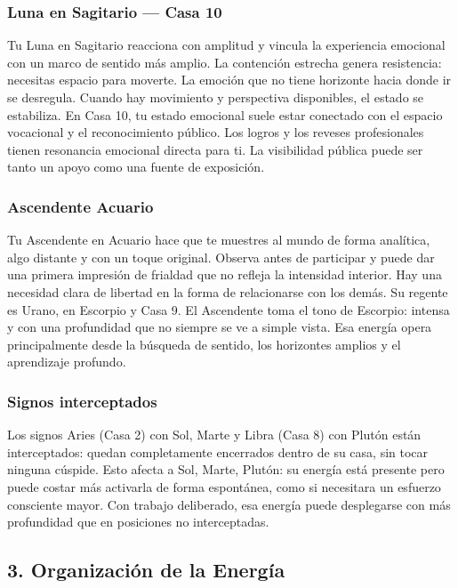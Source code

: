 \documentclass[11pt,a4paper]{article}
\begin{document}
\subsubsection*{Luna en Sagitario — Casa 10}
Tu Luna en Sagitario reacciona con amplitud y vincula la experiencia emocional con un marco de sentido más amplio. La contención estrecha genera resistencia: necesitas espacio para moverte. La emoción que no tiene horizonte hacia donde ir se desregula. Cuando hay movimiento y perspectiva disponibles, el estado se estabiliza. En Casa 10, tu estado emocional suele estar conectado con el espacio vocacional y el reconocimiento público. Los logros y los reveses profesionales tienen resonancia emocional directa para ti. La visibilidad pública puede ser tanto un apoyo como una fuente de exposición.

\subsubsection*{Ascendente Acuario}
Tu Ascendente en Acuario hace que te muestres al mundo de forma analítica, algo distante y con un toque original. Observa antes de participar y puede dar una primera impresión de frialdad que no refleja la intensidad interior. Hay una necesidad clara de libertad en la forma de relacionarse con los demás. Su regente es Urano, en Escorpio y Casa 9. El Ascendente toma el tono de Escorpio: intensa y con una profundidad que no siempre se ve a simple vista. Esa energía opera principalmente desde la búsqueda de sentido, los horizontes amplios y el aprendizaje profundo.

\subsubsection*{Signos interceptados}
Los signos Aries (Casa 2) con Sol, Marte y Libra (Casa 8) con Plutón están interceptados: quedan completamente encerrados dentro de su casa, sin tocar ninguna cúspide. Esto afecta a Sol, Marte, Plutón: su energía está presente pero puede costar más activarla de forma espontánea, como si necesitara un esfuerzo consciente mayor. Con trabajo deliberado, esa energía puede desplegarse con más profundidad que en posiciones no interceptadas.
\subsection{3. Organización de la Energía}
\end{document}
